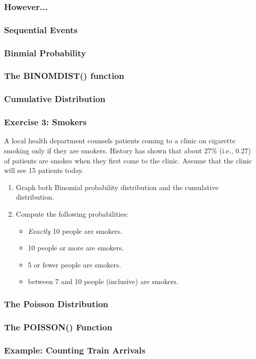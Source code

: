 \documentclass[12pt]{beamer}
\begin{document}
	\begin{frame}
		\frametitle{However...}
	\end{frame}
	\begin{frame}
		\frametitle{Sequential Events}
	\end{frame}
	\begin{frame}
		\frametitle{Binmial Probability}
	\end{frame}
	\begin{frame}
		\frametitle{The BINOMDIST() function}
	\end{frame}
	\begin{frame}
		\frametitle{Cumulative Distribution}
	\end{frame}
	\begin{frame}
		\frametitle{Exercise 3: Smokers}
		A local health department counsels patients coming to a clinic on cigarette smoking only if they are smokers. History has shown that about 27\% (i.e., 0.27) of patients are smokes when they first come to the clinic. Assume that the clinic will see 15 patients today.\\
		\bigskip
		\begin{enumerate}
			\item Graph both Binomial probability distribution and the cumulative distribution.
			\item Compute the following probabilities:
				\begin{itemize}
					\item \textit{Exactly} 10 people are smokers.
					\item 10 people or more are smokers.
					\item 5 or fewer people are smokers.
					\item between 7 and 10 people (inclusive) are smokers.
				\end{itemize}
		\end{enumerate} 
	\end{frame}
	\begin{frame}
		\frametitle{The Poisson Distribution}
	\end{frame}
	\begin{frame}
		\frametitle{The POISSON() Function}
	\end{frame}
	\begin{frame}
		\frametitle{Example: Counting Train Arrivals}
	\end{frame}
\end{document}

